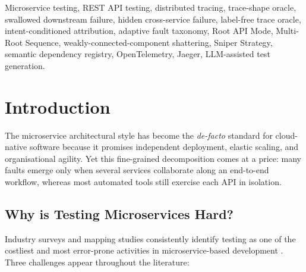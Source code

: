 \documentclass[conference]{IEEEtran}
\begin{document}
\begin{abstract}
versus 3/10 for \textsc{RESTest} and 6/10 for EvoMaster; an intrinsic ablation of the Semantic Dependency Registry recovers all 30 labelled cross-entity bindings at $P{=}R{=}F_1{=}1.000$. A multi-SUT precision/recall evaluation of the hidden-downstream and attribution invariants against a response-level baseline is in progress and is not claimed here.
\end{abstract}

\begin{IEEEkeywords}
Microservice testing, REST API testing, distributed tracing, trace-shape oracle, swallowed downstream failure, hidden cross-service failure, label-free trace oracle, intent-conditioned attribution, adaptive fault taxonomy, Root API Mode, Multi-Root Sequence, weakly-connected-component shattering, Sniper Strategy, semantic dependency registry, OpenTelemetry, Jaeger, LLM-assisted test generation.
\end{IEEEkeywords}

\section{Introduction}
The microservice architectural style has become the \emph{de-facto}
standard for cloud-native software because it promises independent
deployment, elastic scaling, and organisational agility.  Yet this
fine-grained decomposition comes at a price: many faults emerge only
when several services collaborate along an end-to-end workflow, whereas
most automated tools still exercise each API in isolation.

\subsection*{Why is Testing Microservices Hard?}
Industry surveys and mapping studies consistently identify testing as
one of the costliest and most error-prone activities in
microservice-based development
\cite{waseem2020testing,miao2025sms}.  
Three challenges appear throughout the literature:
\end{document}
